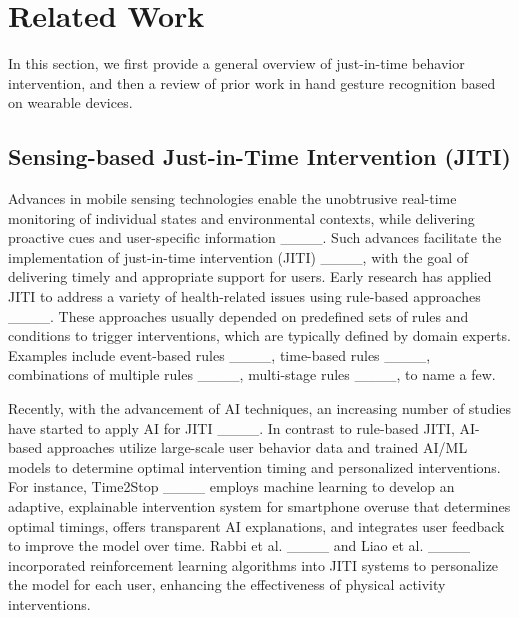 \section{Related Work}
\label{sec:background}

In this section, we first provide a general overview of just-in-time behavior intervention, and then a review of prior work in hand gesture recognition based on wearable devices. 

\subsection{Sensing-based Just-in-Time Intervention (JITI)}

Advances in mobile sensing technologies enable the unobtrusive real-time monitoring of individual states and environmental contexts, while delivering proactive cues and user-specific information ____.
Such advances facilitate the implementation of just-in-time intervention (JITI) ____, with the goal of delivering timely and appropriate support for users.  
Early research has applied JITI to address a variety of health-related issues using rule-based approaches ____.
These approaches usually depended on predefined sets of rules and conditions to trigger interventions, which are typically defined by domain experts. Examples include event-based rules ____, time-based rules ____, combinations of multiple rules ____, multi-stage rules ____, to name a few. 

Recently, with the advancement of AI techniques, an increasing number of studies have started to apply AI for JITI ____. In contrast to rule-based JITI, AI-based approaches utilize large-scale user behavior data and trained AI/ML models to determine optimal intervention timing and personalized interventions.
For instance, Time2Stop ____ employs machine learning to develop an adaptive, explainable intervention system for smartphone overuse that determines optimal timings, offers transparent AI explanations, and integrates user feedback to improve the model over time. Rabbi et al. ____ and Liao et al. ____ incorporated reinforcement learning algorithms into JITI systems to personalize the model for each user, enhancing the effectiveness of physical activity interventions.

